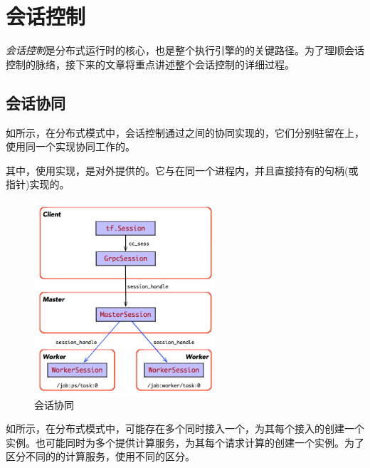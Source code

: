 \section{会话控制}

\begin{content}

\emph{会话控制}是\tf{}分布式运行时的核心，也是整个\tf{}执行引擎的的关键路径。为了理顺会话控制的脉络，接下来的文章将重点讲述整个会话控制的详细过程。


\subsection{会话协同}

如所示，在分布式模式中，会话控制通过之间的协同实现的，它们分别驻留在上，使用同一个实现协同工作的。

其中，使用实现，是\tf{}对外提供的。它与在同一个进程内，并且直接持有的句柄(或指针)实现的。

\begin{figure}[H]
\centering
\includegraphics[width=0.6\textwidth]{figures/dist-session-overview-1.png}
\caption{会话协同}
 \label{fig:dist-session-overview}
\end{figure}

如所示，在分布式模式中，可能存在多个同时接入一个，为其每个接入的创建一个实例。也可能同时为多个提供计算服务，为其每个请求计算的创建一个实例。为了区分不同的的计算服务，使用不同的区分。


\end{content}
